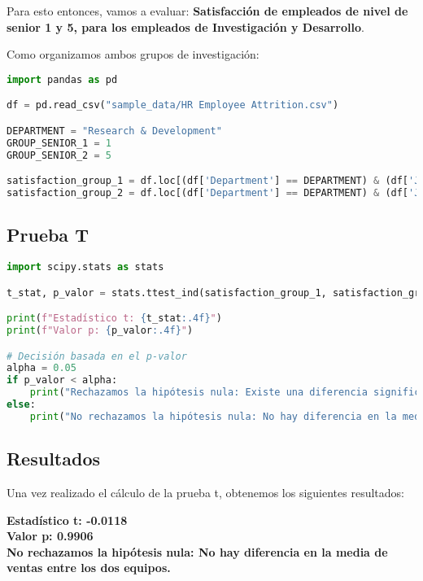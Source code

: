 Para esto entonces, vamos a evaluar: \textbf{Satisfacción de empleados de nivel de senior 1 y 5,
para los empleados de Investigación y Desarrollo}.

Como organizamos ambos grupos de investigación:

\begin{lstlisting}[language=Python]
import pandas as pd

df = pd.read_csv("sample_data/HR Employee Attrition.csv")

DEPARTMENT = "Research & Development"
GROUP_SENIOR_1 = 1
GROUP_SENIOR_2 = 5

satisfaction_group_1 = df.loc[(df['Department'] == DEPARTMENT) & (df['JobLevel'] == GROUP_SENIOR_1), 'JobSatisfaction']
satisfaction_group_2 = df.loc[(df['Department'] == DEPARTMENT) & (df['JobLevel'] == GROUP_SENIOR_2),  'JobSatisfaction']
\end{lstlisting}

\subsection{Prueba T}

\begin{lstlisting}[language=Python]
import scipy.stats as stats

t_stat, p_valor = stats.ttest_ind(satisfaction_group_1, satisfaction_group_2)

print(f"Estadístico t: {t_stat:.4f}")
print(f"Valor p: {p_valor:.4f}")

# Decisión basada en el p-valor
alpha = 0.05
if p_valor < alpha:
    print("Rechazamos la hipótesis nula: Existe una diferencia significativa en la media de ventas entre los dos equipos.")
else:
    print("No rechazamos la hipótesis nula: No hay diferencia en la media de ventas entre los dos equipos.")    
\end{lstlisting}


\subsection{Resultados}
Una vez realizado el cálculo de la prueba t, obtenemos los siguientes resultados:

\textbf{Estadístico t: -0.0118}
\\
\textbf{Valor p: 0.9906}
\\
\textbf{No rechazamos la hipótesis nula: No hay diferencia en la media de ventas entre los dos equipos.}